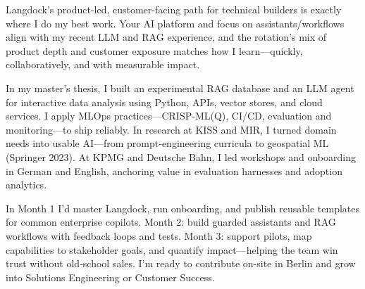 Langdock’s product-led, customer-facing path for technical builders is exactly where I do my best work. Your AI platform and focus on assistants/workflows align with my recent LLM and RAG experience, and the rotation’s mix of product depth and customer exposure matches how I learn—quickly, collaboratively, and with measurable impact.

In my master’s thesis, I built an experimental RAG database and an LLM agent for interactive data analysis using Python, APIs, vector stores, and cloud services. I apply MLOps practices—CRISP‑ML(Q), CI/CD, evaluation and monitoring—to ship reliably. In research at KISS and MIR, I turned domain needs into usable AI—from prompt‑engineering curricula to geospatial ML (Springer 2023). At KPMG and Deutsche Bahn, I led workshops and onboarding in German and English, anchoring value in evaluation harnesses and adoption analytics.

In Month 1 I’d master Langdock, run onboarding, and publish reusable templates for common enterprise copilots. Month 2: build guarded assistants and RAG workflows with feedback loops and tests. Month 3: support pilots, map capabilities to stakeholder goals, and quantify impact—helping the team win trust without old‑school sales. I’m ready to contribute on-site in Berlin and grow into Solutions Engineering or Customer Success.